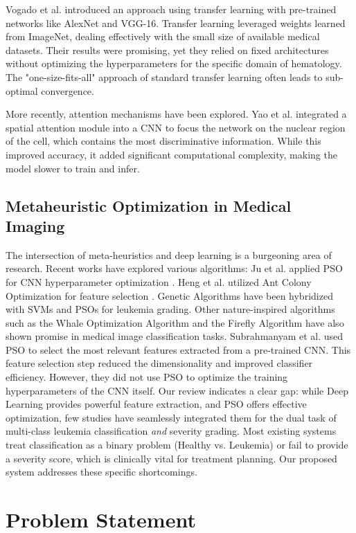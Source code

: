 \documentclass[journal]{IEEEtran}
\begin{document}
Vogado et al. introduced an approach using transfer learning with pre-trained networks like AlexNet and VGG-16. Transfer learning leveraged weights learned from ImageNet, dealing effectively with the small size of available medical datasets. Their results were promising, yet they relied on fixed architectures without optimizing the hyperparameters for the specific domain of hematology. The "one-size-fits-all" approach of standard transfer learning often leads to sub-optimal convergence.

More recently, attention mechanisms have been explored. Yao et al. integrated a spatial attention module into a CNN to focus the network on the nuclear region of the cell, which contains the most discriminative information. While this improved accuracy, it added significant computational complexity, making the model slower to train and infer.

\subsection{Metaheuristic Optimization in Medical Imaging}
The intersection of meta-heuristics and deep learning is a burgeoning area of research. Recent works have explored various algorithms: Ju et al. applied PSO for CNN hyperparameter optimization \cite{r16}. Heng et al. utilized Ant Colony Optimization for feature selection \cite{r17}. Genetic Algorithms have been hybridized with SVMs \cite{r18} and PSOs \cite{r20} for leukemia grading. Other nature-inspired algorithms such as the Whale Optimization Algorithm \cite{r19} and the Firefly Algorithm \cite{r21} have also shown promise in medical image classification tasks.
Subrahmanyam et al. used PSO to select the most relevant features extracted from a pre-trained CNN. This feature selection step reduced the dimensionality and improved classifier efficiency. However, they did not use PSO to optimize the training hyperparameters of the CNN itself.
Our review indicates a clear gap: while Deep Learning provides powerful feature extraction, and PSO offers effective optimization, few studies have seamlessly integrated them for the dual task of multi-class leukemia classification \textit{and} severity grading. Most existing systems treat classification as a binary problem (Healthy vs. Leukemia) or fail to provide a severity score, which is clinically vital for treatment planning. Our proposed system addresses these specific shortcomings.

\section{Problem Statement}
\end{document}
